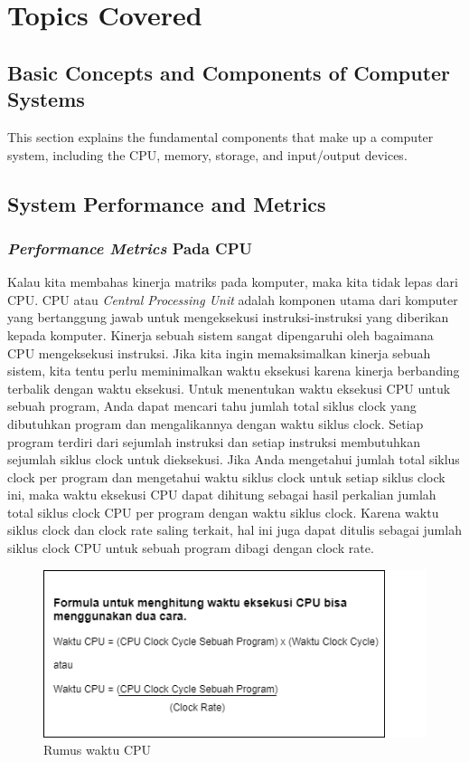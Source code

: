 \documentclass[12pt]{article}
\begin{document}
\section{Topics Covered}

\subsection{Basic Concepts and Components of Computer Systems}
This section explains the fundamental components that make up a computer system, including the CPU, memory, storage, and input/output devices.

\subsection{System Performance and Metrics}
\subsubsection{\textit{Performance Metrics} Pada CPU}
\hspace*{1cm}Kalau kita membahas kinerja matriks pada komputer, maka kita tidak lepas dari CPU. CPU atau \textit{Central Processing Unit} adalah komponen utama dari komputer yang bertanggung jawab untuk mengeksekusi instruksi-instruksi yang diberikan kepada komputer. Kinerja sebuah sistem sangat dipengaruhi oleh bagaimana CPU mengeksekusi instruksi. Jika kita ingin memaksimalkan kinerja sebuah sistem, kita tentu perlu meminimalkan waktu eksekusi karena kinerja berbanding terbalik dengan waktu eksekusi.
\newline
\newline
\hspace*{1cm}Untuk menentukan waktu eksekusi CPU untuk sebuah program, Anda dapat mencari tahu jumlah total siklus clock yang dibutuhkan program dan mengalikannya dengan waktu siklus clock. Setiap program terdiri dari sejumlah instruksi dan setiap instruksi membutuhkan sejumlah siklus clock untuk dieksekusi. Jika Anda mengetahui jumlah total siklus clock per program dan mengetahui waktu siklus clock untuk setiap siklus clock ini, maka waktu eksekusi CPU dapat dihitung sebagai hasil perkalian jumlah total siklus clock CPU per program dengan waktu siklus clock. Karena waktu siklus clock dan clock rate saling terkait, hal ini juga dapat ditulis sebagai jumlah siklus clock CPU untuk sebuah program dibagi dengan clock rate.

\begin{figure}
    \centering
    \includegraphics[width=\linewidth]{asset/image1.png}
    \caption{Rumus waktu CPU}
\end{figure}
\end{document}
